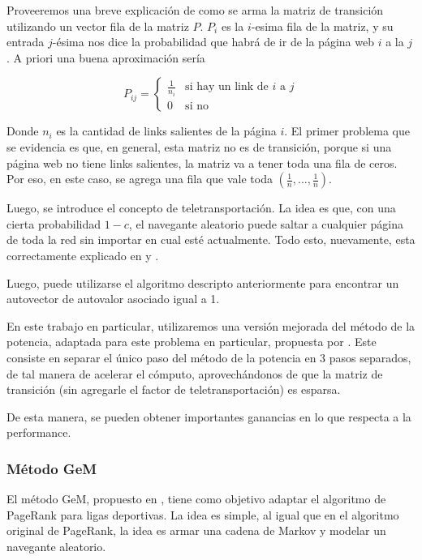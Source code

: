 Proveeremos una breve explicación de como se arma la matriz de transición utilizando un vector fila de la matriz $P$. 
$P_i$ es la $i$-esima fila de la matriz, y su entrada $j$-ésima nos dice la probabilidad que habrá de ir de la página web $i$ a la $j$. A priori una buena aproximación sería

\[ P_{ij} = \begin{cases} 
      \frac{1}{n_i} & \text{si hay un link de $i$ a $j$} \\
       0 & \text{si no}
   \end{cases}
\] 

Donde $n_i$ es la cantidad de links salientes de la página $i$.
El primer problema que se evidencia es que, en general, esta matriz no es de transición, porque si una página web no tiene links salientes, la matriz va a tener toda una fila de ceros. Por eso, en este caso, se agrega una fila que vale toda $(\frac1n, ..., \frac1n)$.

Luego, se introduce el concepto de teletransportación. La idea es que, con una cierta probabilidad $1-c$, el navegante aleatorio puede saltar a cualquier página de toda la red sin importar en cual esté actualmente. Todo esto, nuevamente, esta correctamente explicado en \cite{Brin1998} y \cite{Kamvar2003}.

Luego, puede utilizarse el algoritmo descripto anteriormente para encontrar un autovector de autovalor asociado igual a 1.

En este trabajo en particular, utilizaremos una versión mejorada del m\'etodo de la potencia, adaptada para este problema en particular, propuesta por \cite{Kamvar2003}. Este consiste en separar el único paso del método de la potencia en 3 pasos separados, de tal manera de acelerar el cómputo, aprovechándonos de que la matriz de transición (sin agregarle el factor de teletransportación) es esparsa.

De esta manera, se pueden obtener importantes ganancias en lo que respecta a la performance.

\subsubsection{Método GeM}

El método GeM, propuesto en \cite{Govan2008}, tiene como objetivo adaptar el algoritmo de PageRank para ligas deportivas. La idea es simple, al igual que en el algoritmo original de PageRank, la idea es armar una cadena de Markov y modelar un navegante aleatorio.

